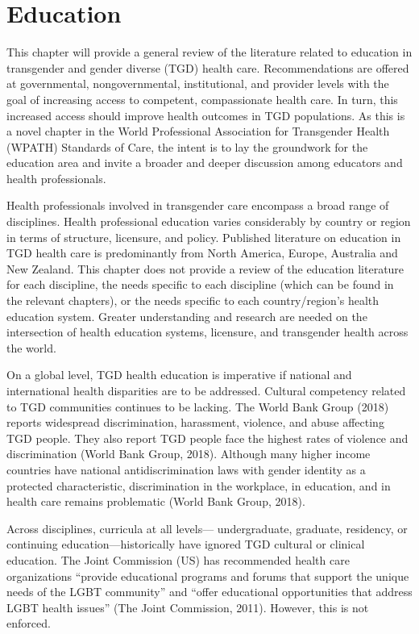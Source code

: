 \documentclass[
]{book}
\begin{document}
\hypertarget{education}{%
\chapter{Education}\label{education}}

This chapter will provide a general review of the
literature related to education in transgender and
gender diverse (TGD) health care.
Recommendations are offered at governmental,
nongovernmental, institutional, and provider levels with the goal of increasing access to competent, compassionate health care. In turn, this
increased access should improve health outcomes
in TGD populations. As this is a novel chapter
in the World Professional Association for
Transgender Health (WPATH) Standards of Care,
the intent is to lay the groundwork for the education area and invite a broader and deeper discussion among educators and health
professionals.

Health professionals involved in transgender
care encompass a broad range of disciplines.
Health professional education varies considerably
by country or region in terms of structure,
licensure, and policy. Published literature on
education in TGD health care is predominantly
from North America, Europe, Australia and New
Zealand. This chapter does not provide a review
of the education literature for each discipline,
the needs specific to each discipline (which can
be found in the relevant chapters), or the needs
specific to each country/region's health education system. Greater understanding and research
are needed on the intersection of health education systems, licensure, and transgender health
across the world.

On a global level, TGD health education is
imperative if national and international health disparities are to be addressed. Cultural competency
related to TGD communities continues to be lacking. The World Bank Group (2018) reports widespread discrimination, harassment, violence, and
abuse affecting TGD people. They also report
TGD people face the highest rates of violence and
discrimination (World Bank Group, 2018).
Although many higher income countries have
national antidiscrimination laws with gender identity as a protected characteristic, discrimination in
the workplace, in education, and in health care
remains problematic (World Bank Group, 2018).

Across disciplines, curricula at all levels---
undergraduate, graduate, residency, or continuing education---historically have ignored TGD
cultural or clinical education. The Joint
Commission (US) has recommended health care
organizations ``provide educational programs and
forums that support the unique needs of the
LGBT community'' and ``offer educational opportunities that address LGBT health issues'' (The
Joint Commission, 2011). However, this is not
enforced.
\end{document}
